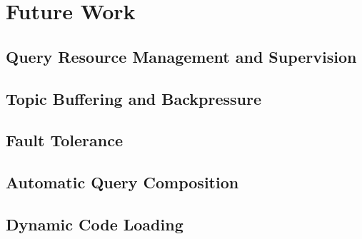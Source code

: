 \section{Future Work}

\subsection{Query Resource Management and Supervision}

\subsection{Topic Buffering and Backpressure}

\subsection{Fault Tolerance}

\subsection{Automatic Query Composition}

\subsection{Dynamic Code Loading}
